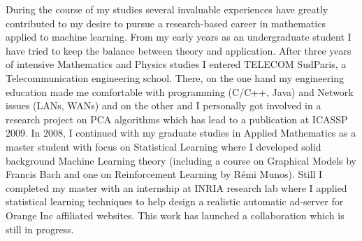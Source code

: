 During the course of my studies several invaluable experiences have greatly contributed to my desire to pursue a research-based career in mathematics applied to machine learning. %
From my early years as an undergraduate student I have tried to keep the balance between theory and application. After three years of intensive Mathematics and Physics studies I entered TELECOM SudParis, a Telecommunication engineering school. There, on the one hand my engineering education made me comfortable with programming (C/C++, Java) and Network issues (LANs, WANs) and on the other and I personally got involved in a research project on PCA algorithms which has lead to a publication at ICASSP 2009. In 2008, I continued with my graduate studies in Applied Mathematics as a master student with focus on Statistical Learning where I developed solid background Machine Learning theory (including a course on Graphical Models by Francis Bach and one on Reinforcement Learning by Rémi Munos). Still I completed my master with an internship at INRIA research lab where I applied statistical learning techniques to help design a realistic automatic ad-server for Orange Inc affiliated websites. This work has launched a collaboration which is still in progress.
 
